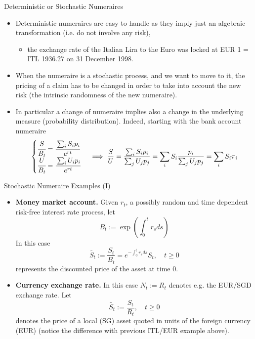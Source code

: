 \documentclass{beamer}
\begin{document}
	\begin{frame}{Deterministic or Stochastic Numeraires}
		\begin{itemize}
			\item<1-> \textcolor{maincolor}{Deterministic numeraires} are easy to handle as they imply just an algebraic transformation (i.e. do not involve any risk),
			\begin{itemize}
				\item the exchange rate of the Italian Lira to the Euro was locked at EUR 1 = ITL 1936.27 on 31 December 1998.
			\end{itemize}
			\item<2-> When the numeraire is a \textcolor{maincolor}{stochastic process}, and we want to move to it, the pricing of a claim has to be changed in order to take into account the new risk (the intrinsic randomness of the new numeraire).
			\item<3-> In particular a change of numeraire implies also a change in the underlying measure (probability distribution). Indeed, starting with the bank account numeraire
			\begin{equation*}
				\begin{cases}
					\cfrac{S}{B_t} = \cfrac{\sum_i S_i p_i}{e^{rt}}\\
					\cfrac{U}{B_t} = \cfrac{\sum_i U_i p_i}{e^{rt}}
				\end{cases}\implies
				\frac{S}{U} = \frac{\sum_i S_i p_i}{\sum_j U_j p_j} = \sum_i S_i \frac{p_i}{\sum_j U_j p_j} = \sum_i S_i \pi_i
			\end{equation*}
		\end{itemize}
	\end{frame}

	\begin{frame}{Stochastic Numeraire Examples (I)}
		\begin{itemize}
			\item<1-> \textbf{Money market account.} Given $r_t$, a possibly random and time dependent risk-free interest rate process, let
			\begin{equation*}
				B_t := \exp\left(\int_0^t r_s ds\right)
			\end{equation*}
			In this case
			\begin{equation*}
				\tilde{S_t}:=\frac{S_t}{B_t}=e^{-\int_0^t r_s ds}S_t, \quad t \ge 0
			\end{equation*}
			represents the discounted price of the asset at time 0.
			\item<2-> \textbf{Currency exchange rate.} In this case $N_t := R_t$ denotes e.g. the EUR/SGD exchange rate. Let
			\begin{equation*}
				\tilde{S_t}:=\frac{S_t}{R_t}, \quad t \ge 0
			\end{equation*}
			denotes the price of a local (SG) asset quoted in units of the foreign currency (EUR) (notice the difference with previous ITL/EUR example above).
		\end{itemize}
	\end{frame}
\end{document}
